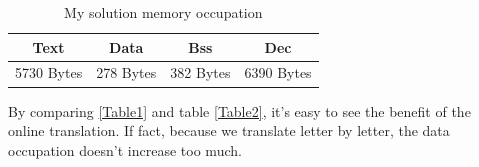 \documentclass[a4paper]{article}
\begin{document}
\begin{table}[h]
  \centering
  \begin{tabular}{|| c || c || c || c ||}
    \hline
    \textbf{Text} & \textbf{Data} & \textbf{Bss} & \textbf{Dec} \\
    \hline
    5730 Bytes    & 278 Bytes     & 382 Bytes    & 6390 Bytes   \\
    \hline
  \end{tabular}
  \caption{My solution memory occupation}
  \label{Table2}
\end{table}

By comparing \autoref{Table1} and table \autoref{Table2}, it's easy to see the benefit of the online translation. If fact, because we translate letter by letter, the data occupation doesn't increase too much.
\end{document}
